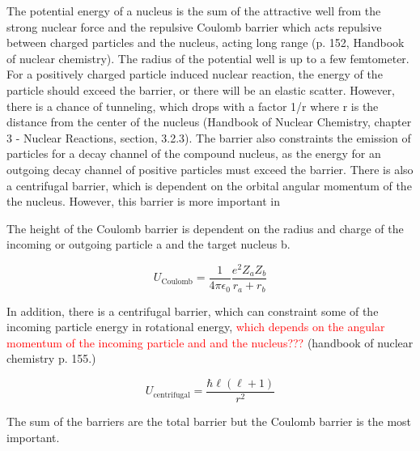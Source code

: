 \documentclass[a4paper,11pt,twoside]{book}
\begin{document}
The potential energy of a nucleus is the sum of the attractive well from the strong nuclear force and the repulsive Coulomb barrier which acts repulsive between charged particles and the nucleus, acting long range (p. 152, Handbook of nuclear chemistry). The radius of the potential well is up to a few femtometer. For a positively charged particle induced nuclear reaction, the energy of the particle should exceed the barrier, or there will be an elastic scatter. However, there is a chance of tunneling, which drops with a factor 1/r where r is the distance from the center of the nucleus (Handbook of Nuclear Chemistry, chapter 3 - Nuclear Reactions, section, 3.2.3). The barrier also constraints the emission of particles for a decay channel of the compound nucleus, as the energy for an outgoing decay channel of positive particles must exceed the barrier. There is also a centrifugal barrier, which is dependent on the orbital angular momentum of the the nucleus.  However, this barrier is more important in 

The height of the Coulomb barrier is dependent on the radius and charge of the incoming or outgoing particle a and the target nucleus b.

\begin{equation}
    U_\text{Coulomb} = \frac{1}{4\pi \epsilon_0} \frac{e^2Z_a Z_b}{r_a + r_b}
\end{equation}

In addition, there is a centrifugal barrier, which can constraint some of the incoming particle energy in rotational energy, \textcolor{red}{which depends on the angular momentum of the incoming particle and and the nucleus???} (handbook of nuclear chemistry p. 155.)

\begin{equation}
    U_\text{centrifugal} = \frac{\hbar \ell (\ell+1)}{r^2}
\end{equation}

The sum of the barriers are the total barrier but the Coulomb barrier is the most important. 

\end{document}
